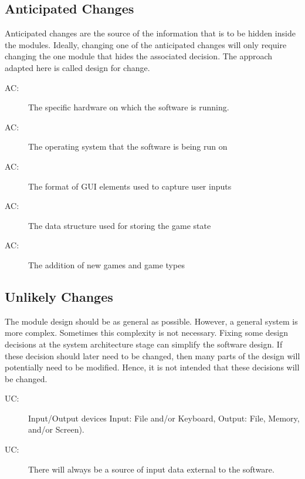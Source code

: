 \documentclass[12pt, titlepage]{article}
\newcounter{acnum}
\newcommand{\actheacnum}{AC\theacnum}
\newcounter{ucnum}
\newcommand{\uctheucnum}{UC\theucnum}
\begin{document}
	\subsection{Anticipated Changes} \label{SecAchange}
	Anticipated changes are the source of the information that is to be hidden
	inside the modules. Ideally, changing one of the anticipated changes will 
	only require changing the one module that hides the associated decision. 
	The approach adapted here is called design for change.
	\begin{description}
		\item[ \actheacnum \label{acHardware}:] The 
		specific hardware on which the software is running.
		\item[ \actheacnum \label{acOS}:] The operating 
		system that the software is being run on
		\item[ \actheacnum \label{acGUI}:] The format of 
		GUI elements used to capture user inputs
		\item[ \actheacnum \label{acStruct}:] The data 
		structure used for storing the game state
		\item[ \actheacnum \label{acGames}:] The addition 
		of new games and game types
	\end{description}
	\subsection{Unlikely Changes} \label{SecUchange}
	The module design should be as general as possible. However, a general 
	system is more complex. Sometimes this complexity is not necessary. Fixing 
	some design decisions at the system architecture stage can simplify the 
	software design. If these decision should later need to be changed, then 
	many parts of the design will potentially need to be modified. Hence, it is 
	not intended that these decisions will be changed.
	\begin{description}
		\item[ \uctheucnum \label{ucIO}:] Input/Output 
		devices Input: File and/or Keyboard, Output: File, Memory, and/or 
		Screen).
		\item[ \uctheucnum \label{ucInput}:] There will 
		always be a source of input data external to the software.
	\end{description}
\end{document}
